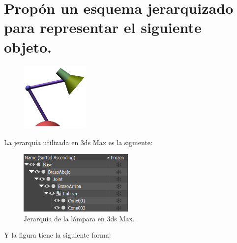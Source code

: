 \documentclass{article}
\begin{document}
\section{Propón un esquema jerarquizado para representar el siguiente objeto.}

\begin{figure}[H]
    \centering
    \includegraphics[width=0.3\textwidth]{imagenes/lamp.png}
 \end{figure}    


La jerarquía utilizada en 3ds Max es la siguiente:

\begin{figure}[H]
    \centering
    \includegraphics[width=0.5\textwidth]{imagenes/lampjerar.png}
    \caption{Jerarquía de la lámpara en 3ds Max.}
 \end{figure}    

\newpage

Y la figura tiene la siguiente forma:
\end{document}
